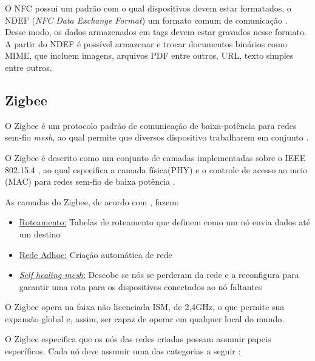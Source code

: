 \documentclass[
	article,			%
	11pt,				%
	oneside,			%
	a4paper,			%
	section=TITLE,		%
	subsection=TITLE,	%
	english,			%
	brazil,				%
	sumario=tradicional
	]{abntex2}
\begin{document}
O NFC possui um padrão com o qual dispositivos devem estar formatados, o NDEF (\textit{NFC Data 
Exchange Format}) um formato comum de comunicação \cite{brianjepsondoncolemantomigoe2014}. Desse 
modo, os dados armazenados em tags devem estar gravados nesse formato. A partir do NDEF é possível 
armazenar e trocar documentos binários como MIME, que incluem imagens, arquivos PDF entre outros, 
URL, texto simples entre outros.







\subsection{Zigbee}

O Zigbee é um protocolo padrão de comunicação de baixa-potência para redes sem-fio \textit{mesh}, 
ao qual permite que diversos dispositivo trabalharem em conjunto \cite{FALUDI2010}.

O Zigbee é descrito como um conjunto de camadas implementadas sobre o IEEE 802.15.4 \cite{FALUDI2010}, ao qual 
especifica a camada física(PHY) e o controle de acesso ao meio (MAC) para 
redes sem-fio de baixa potência \cite{IEEE802154_2011}.

As camadas do Zigbee, de acordo com \cite{FALUDI2010}, fazem:

\begin{itemize} \parskip -4pt
	\item \underline{Roteamento:} Tabelas de roteamento que definem como um nó envia dados até um 
	destino
	\item \underline{Rede Adhoc:} Criação automática de rede
	\item \underline{\textit{Self healing mesh}:} Descobe se nós se perderam da rede e a 
	reconfigura para garantir uma rota para os dispositivos conectados ao nó faltantes
\end{itemize}

O Zigbee opera na faixa não licenciada ISM, de 2,4GHz, o que permite sua expansão global e, assim, ser capaz de operar em qualquer local do mundo.

O Zigbee especifica que os nós das redes criadas possam assumir papeis específicos. Cada nó deve 
assumir uma das categorias a seguir \cite{FALUDI2010}:
\end{document}
